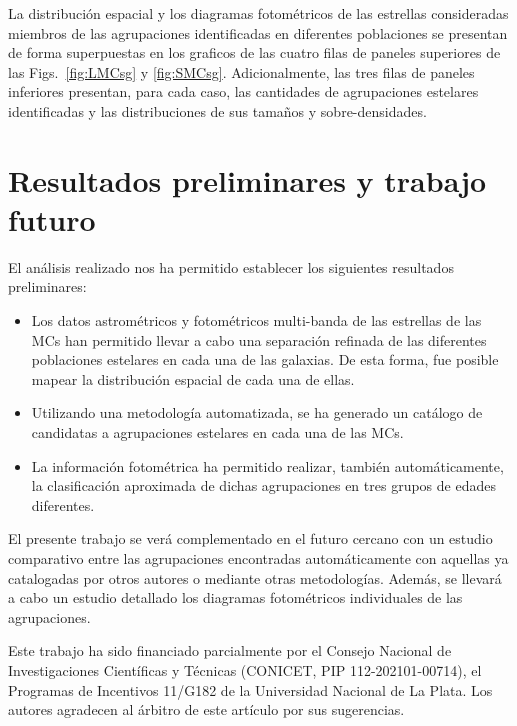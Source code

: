 \documentclass[baaa]{baaa}
\begin{document}
La distribución espacial y los diagramas fotométricos de las estrellas consideradas miembros de las agrupaciones identificadas en diferentes poblaciones se presentan de forma superpuestas en los graficos de las cuatro filas de paneles superiores de las Figs.~\ref{fig:LMCsg} y \ref{fig:SMCsg}. Adicionalmente, las tres filas de paneles inferiores presentan, para cada caso, las cantidades de agrupaciones estelares identificadas y las distribuciones de sus tamaños y sobre-densidades.

\section{Resultados preliminares y trabajo futuro}

El análisis realizado nos ha permitido establecer los siguientes resultados preliminares:
\begin{itemize}
\item Los datos astrométricos y fotométricos multi-banda de las estrellas de las MCs han permitido llevar a cabo una separación refinada de las diferentes poblaciones estelares en cada una de las galaxias. De esta forma, fue posible mapear la distribución espacial de cada una de ellas.
\item Utilizando una metodología automatizada, se ha generado un catálogo de candidatas a agrupaciones estelares en cada una de las MCs.
\item La información fotométrica ha permitido realizar, también automáticamente, la clasificación aproximada de dichas agrupaciones en tres grupos de edades diferentes.
\end{itemize}

El presente trabajo se verá complementado en el futuro cercano con un estudio comparativo entre las agrupaciones encontradas automáticamente con aquellas ya catalogadas por otros autores o mediante otras metodologías. Además, se llevará a cabo un estudio detallado los diagramas fotométricos individuales de las agrupaciones.

\begin{acknowledgement}
Este trabajo ha sido financiado parcialmente por el Consejo Nacional de Investigaciones Científicas y Técnicas (CONICET, PIP 112-202101-00714), el Programas de Incentivos 11/G182 de la Universidad Nacional de La Plata. Los autores agradecen al árbitro de este artículo por sus sugerencias.
\end{acknowledgement}
\end{document}
